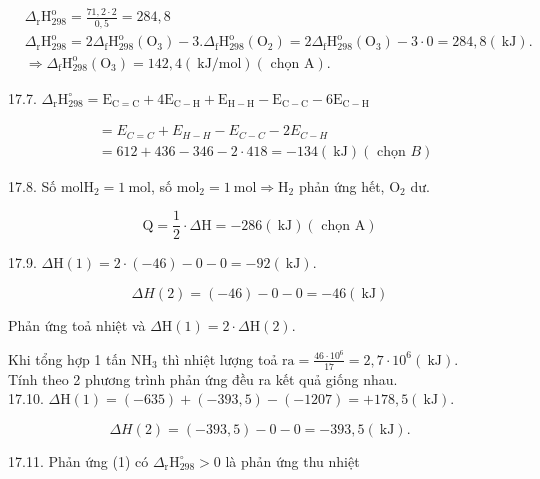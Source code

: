 \documentclass[10pt]{article}
\begin{document}
$$
\begin{aligned}
& \Delta_{\mathrm{r}} \mathrm{H}_{298}^{\mathrm{o}}=\frac{71,2 \cdot 2}{0,5}=284,8 \\
& \Delta_{\mathrm{r}} \mathrm{H}_{298}^{\mathrm{o}}=2 \Delta_{\mathrm{f}} \mathrm{H}_{298}^{\mathrm{o}}\left(\mathrm{O}_{3}\right)-3 . \Delta_{\mathrm{f}} \mathrm{H}_{298}^{\mathrm{o}}\left(\mathrm{O}_{2}\right)=2 \Delta_{\mathrm{f}} \mathrm{H}_{298}^{\mathrm{o}}\left(\mathrm{O}_{3}\right)-3 \cdot 0=284,8(\mathrm{~kJ}) . \\
& \Rightarrow \Delta_{\mathrm{f}} \mathrm{H}_{298}^{\mathrm{o}}\left(\mathrm{O}_{3}\right)=142,4(\mathrm{~kJ} / \mathrm{mol})(\text { chọn } \mathrm{A}) .
\end{aligned}
$$

17.7. $\Delta_{\mathrm{r}} \mathrm{H}_{298}^{\circ}=\mathrm{E}_{\mathrm{C}=\mathrm{C}}+4 \mathrm{E}_{\mathrm{C}-\mathrm{H}}+\mathrm{E}_{\mathrm{H}-\mathrm{H}}-\mathrm{E}_{\mathrm{C}-\mathrm{C}}-6 \mathrm{E}_{\mathrm{C}-\mathrm{H}}$

$$
\begin{aligned}
& =E_{C=C}+E_{H-H}-E_{C-C}-2 E_{C-H} \\
& =612+436-346-2 \cdot 418=-134(\mathrm{~kJ})(\text { chọn } B)
\end{aligned}
$$

17.8. Số $\mathrm{mol} \mathrm{H}_{2}=1 \mathrm{~mol}$, số $\mathrm{mol}_{2}=1 \mathrm{~mol} \Rightarrow \mathrm{H}_{2}$ phản ứng hết, $\mathrm{O}_{2}$ dư.

$$
\mathrm{Q}=\frac{1}{2} \cdot \Delta \mathrm{H}=-286(\mathrm{~kJ})(\text { chọn } \mathrm{A})
$$

17.9. $\Delta \mathrm{H}(1)=2 \cdot(-46)-0-0=-92(\mathrm{~kJ})$.

$$
\Delta H(2)=(-46)-0-0=-46(\mathrm{~kJ})
$$

Phản ứng toả nhiệt và $\Delta \mathrm{H}(1)=2 \cdot \Delta \mathrm{H}(2)$.

Khi tổng hợp 1 tấn $\mathrm{NH}_{3}$ thì nhiệt lượng toả $\mathrm{ra}=\frac{46 \cdot 10^{6}}{17}=2,7 \cdot 10^{6}(\mathrm{~kJ})$.\\
Tính theo 2 phương trình phản ứng đều ra kết quả giống nhau.\\
17.10. $\Delta \mathrm{H}(1)=(-635)+(-393,5)-(-1207)=+178,5(\mathrm{~kJ})$.

$$
\Delta H(2)=(-393,5)-0-0=-393,5(\mathrm{~kJ}) .
$$

17.11. Phản ứng (1) có $\Delta_{\mathrm{r}} \mathrm{H}_{298}^{\circ}>0$ là phản ứng thu nhiệt
\end{document}
